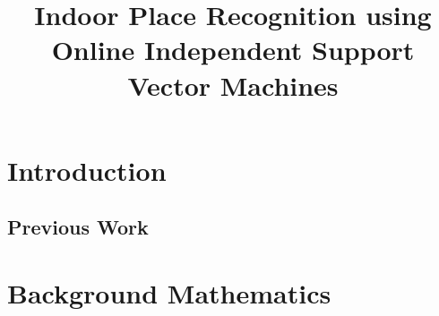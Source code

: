 \documentclass{bmvc}
\begin{document}

\title{Indoor Place Recognition using Online Independent Support Vector Machines}


\author{}

\maketitle


\begin{abstract}
  
\end{abstract}

\section{Introduction}
\label{introduction}


\subsection{Previous Work}
\label{prev-work}


\section{Background Mathematics}
\label{sec:bg}

\end{document}
